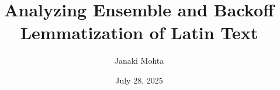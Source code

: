 



\title[Analyzing Ensemble and Backoff Lemmatization of Latin Text]{Analyzing Ensemble and Backoff Lemmatization of Latin Text}

\author[Janaki Mohta]{Janaki Mohta}



\vspace{-2cm}\date{July 28, 2025}

